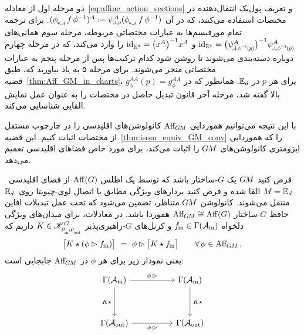 دو مرحله اول از معادله~\eqref{eq:affine_action_sections} و تعریف پول‌بک انتقال‌دهنده در مختصات استفاده می‌کنند، که در آن $(\dphiA f\, \phi^{-1})^A := \psiAp^A(\dphiA f\, \phi^{-1})$.
برای ترجمه تمام مورفیسم‌ها به عبارات مختصاتی مربوطه، مرحله سوم همانی‌های $\id_{\R^c} = \big( \psiAphiinvp^A \big)^{-1} \psiAphiinvp^A$ و $\mathrm{id}_{\mathbb{R}^d} = \big( x^A \big)^{-1} x^A$ را وارد می‌کند، که در مرحله چهارم دوباره دسته‌بندی می‌شوند تا روشن شود کدام ترکیب‌ها پس از مرحله پنجم به عبارات مختصاتی منجر می‌شوند.
برای مرحله ۵ به یاد بیاورید که، طبق قضیه~\ref{thm:Aff_GM_in_charts}، $g_\phi^{AA}(p) = g_\phi^{AA}$ برای هر $p$ در $\mathbb{E}_d$.
همانطور که در بالا گفته شد، مرحله آخر قانون تبدیل حاصل در مختصات را به عنوان عمل نمایش القایی شناسایی می‌کند.

با این نتیجه می‌توانیم هموردایی $\operatorname{Aff}_{\mkern-2muG\mkern-1.4muM}$ کانولوشن‌های اقلیدسی را در چارچوب مستقل از مختصات اثبات کنیم.
این قضیه~\ref{thm:isom_equiv_GM_conv} را که هموردایی ایزومتری کانولوشن‌های $G\mkern-1.4muM$ را اثبات می‌کند، برای مورد خاص فضاهای اقلیدسی تعمیم می‌دهد.
\begin{thm}
	\label{thm:affine_equivariance_Euclidean_GM_conv}
	فرض کنید $G\mkern-1.4muM$ یک $G$-ساختار باشد که توسط یک اطلس $\operatorname{Aff}(G)$ از فضای اقلیدسی~${M = \mathbb{E}_d}$ القا شده و فرض کنید بردارهای ویژگی مطابق با اتصال لوی-چیویتا روی~$\mathbb{E}_d$ منتقل می‌شوند.
	کانولوشن $G\mkern-1.4muM$ متناظر، تضمین می‌شود که تحت عمل تبدیلات افاین حافظ $G$-ساختار $\operatorname{Aff}_{\mkern-2muG\mkern-1.4muM} \cong \operatorname{Aff}(G)$ هموردا باشد.
	در معادلات، برای میدان‌های ویژگی دلخواه $f_\textup{\;\!\!in} \in \Gamma(\mathcal{A}_\textup{in})$ و کرنل‌های $G$-راهبری‌پذیر $K\in\KG$ داریم که
	\begin{align}
		\big[K \star (\phi\rhd f_\textup{\;\!\!in}) \big]\ =\ \phi\rhd \big[K \star f_\textup{\;\!\!in} \big] \qquad \forall\, \phi\in\operatorname{Aff}_{\mkern-2muG\mkern-1.4muM} \,,
	\end{align}
	یعنی نمودار زیر برای هر $\phi$ در $\operatorname{Aff}_{\mkern-2muG\mkern-1.4muM}$ جابجایی است:
	\begin{equation}\label{cd:affine_equivariance_euclidean_gm_conv}
		\begin{tikzcd}[row sep=3.5em, column sep=5.em]
			\Gamma(\Ain)
			\arrow[r, pos=.5, "{\phi \,\rhd}"]
			\arrow[d, "{K\star\,}"']
			& \Gamma(\Ain)
			\arrow[d, "{\,K\star}"]
			\\
			\Gamma(\Aout)
			\arrow[r, pos=.5, "{\phi \,\rhd}"']
			& \Gamma(\Aout)
		\end{tikzcd}
	\end{equation}
\end{thm}

